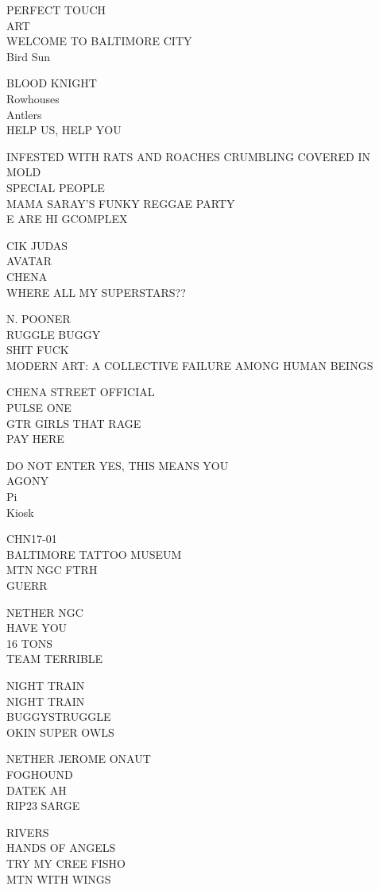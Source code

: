 \documentclass[10pt,letterpaper]{article}
\begin{document}
PERFECT TOUCH\\
ART\\
WELCOME TO BALTIMORE CITY\\
Bird Sun

BLOOD KNIGHT\\
Rowhouses\\
Antlers\\
HELP US, HELP YOU

INFESTED WITH RATS AND ROACHES CRUMBLING COVERED IN MOLD\\
SPECIAL PEOPLE\\
MAMA SARAY'S FUNKY REGGAE PARTY\\
E ARE HI GCOMPLEX

CIK JUDAS\\
AVATAR\\
CHENA\\
WHERE ALL MY SUPERSTARS??

N. POONER\\
RUGGLE BUGGY\\
SHIT FUCK\\
MODERN ART: A COLLECTIVE FAILURE AMONG HUMAN BEINGS

CHENA STREET OFFICIAL\\
PULSE ONE\\
GTR GIRLS THAT RAGE\\
PAY HERE

DO NOT ENTER YES, THIS MEANS YOU\\
AGONY\\
Pi\\
Kiosk

CHN17{-}01\\
BALTIMORE TATTOO MUSEUM\\
MTN NGC FTRH\\
GUERR

NETHER NGC\\
HAVE YOU\\
16 TONS\\
TEAM TERRIBLE

NIGHT TRAIN\\
NIGHT TRAIN\\
BUGGYSTRUGGLE\\
OKIN SUPER OWLS

NETHER JEROME ONAUT\\
FOGHOUND\\
DATEK AH\\
RIP23 SARGE

RIVERS\\
HANDS OF ANGELS\\
TRY MY CREE FISHO\\
MTN WITH WINGS
\end{document}
